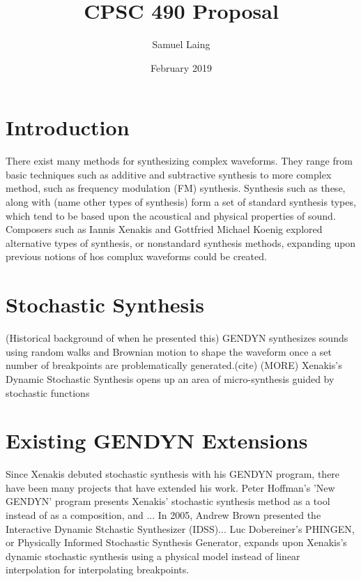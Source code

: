 \documentclass{article}
\title{CPSC 490 Proposal}
\author{Samuel Laing}
\date{February 2019}
\begin{document}
\maketitle

\section{Introduction}
There exist many methods for synthesizing complex waveforms. They range from basic techniques such as additive and subtractive synthesis to more complex method, such as frequency modulation (FM) synthesis. Synthesis such as these, along with (name other types of synthesis) form a set of standard synthesis types, which tend to be based upon the acoustical and physical properties of sound. Composers such as Iannis Xenakis and Gottfried Michael Koenig explored alternative types of synthesis, or nonstandard synthesis methods, expanding upon previous notions of hos complux waveforms could be created.\citep{luc2011dobereiner}

\section{Stochastic Synthesis}
(Historical background of when he presented this) GENDYN synthesizes sounds using random walks and Brownian motion to shape the waveform once a set number of breakpoints are problematically generated.(cite) (MORE) Xenakis's Dynamic Stochastic Synthesis opens up an area of micro-synthesis guided by stochastic functions

\section{Existing GENDYN Extensions}
Since Xenakis debuted stochastic synthesis with his GENDYN program, there have been many projects that have extended his work. Peter Hoffman's 'New GENDYN' program presents Xenakis' stochastic synthesis method as a tool instead of as a composition, and ... \citep{hoffman2000} In 2005, Andrew Brown presented the Interactive Dynamic Stchastic Synthesizer (IDSS)... \citep{brown2005} Luc Dobereiner's PHINGEN, or Physically Informed Stochastic Synthesis Generator, expands upon Xenakis's dynamic stochastic synthesis using a physical model instead of linear interpolation for interpolating breakpoints.\citep{lucICMC}
\end{document}
